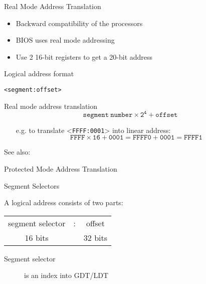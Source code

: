 \begin{frame}{Real Mode Address Translation}
  \begin{itemize}
  \item Backward compatibility of the processors
  \item BIOS uses real mode addressing
  \item Use 2 16-bit registers to get a 20-bit address
  \end{itemize}

  \begin{block}{Logical address format}
    \begin{center}
      \texttt{<segment:offset>}
    \end{center}
  \end{block}

  \begin{block}{Real mode address translation}
    $$\mathtt{segment\ number\times{}2^4+offset}$$
    \begin{itemize}
    \item[e.g.] to translate <\texttt{FFFF:0001}> into linear address:
      $$\mathtt{FFFF \times{} 16 + 0001 = FFFF0 + 0001 = FFFF1}$$
    \end{itemize}
  \end{block}
\end{frame}

See also: 

\begin{frame}{Protected Mode Address Translation}
  \begin{center}
  \end{center}
\end{frame}

\begin{frame}{Segment Selectors}
  \begin{block}{A logical address consists of two parts:}
    \begin{center}
      \begin{tabular}{ccc}
        segment selector&:&offset\\
        {\scriptsize 16 bits}&&{\scriptsize 32 bits}
      \end{tabular}
    \end{center}
  \end{block}
  \begin{description}
  \item[Segment selector] is an index into GDT/LDT
  \end{description}
  \begin{center}
  \end{center}
\end{frame}

